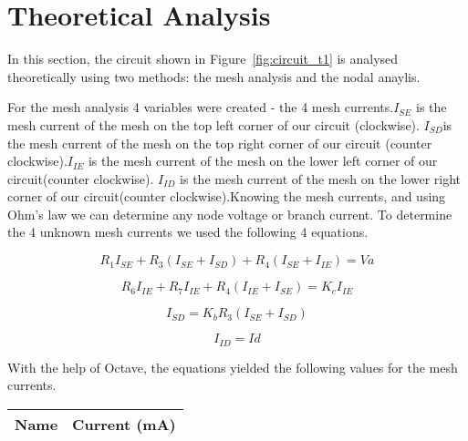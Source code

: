 \section{Theoretical Analysis}
\label{sec:analysis}

In this section, the circuit shown in Figure~\ref{fig:circuit_t1} is analysed
theoretically using two methods: the mesh analysis and the nodal anaylis.\par
For the mesh analysis 4 variables were created - the 4 mesh currents.{\it$I_{SE}$ } is the mesh current of the mesh on the top left corner of our circuit (clockwise). {\it$I_{SD}$}is the mesh current of the mesh on the top right corner of our circuit (counter clockwise).{\it$I_{IE}$ } is the mesh current of the mesh on the lower left corner of our circuit(counter clockwise). {\it$I_{ID}$} is the mesh current of the mesh on the lower right corner of our circuit(counter clockwise).Knowing the mesh currents, and using Ohm's law we can determine any node voltage or branch current. To determine the 4 unknown mesh currents we used the following 4 equations.


%
\begin {equation}
	R_1I_{SE} + R_3(I_{SE}+I_{SD}) + R_4(I_{SE}+I_{IE}) = Va
	\label{eq:m1}
\end{equation}

\begin {equation}
	R_6I_{IE} + R_7I_{IE} + R_4(I_{IE}+I_{SE}) = K_cI_{IE}
	\label{eq:m2}
\end{equation}

\begin {equation}
	I_{SD} = K_bR_3(I_{SE}+I_{SD})
	\label{eq:m3}
\end{equation}

\begin {equation}
	I_{ID} = Id
	\label{eq:m4}
\end{equation}

With the help of Octave, the equations yielded the following values for the mesh currents.\par

\begin{table}[h]
  \centering
  \begin{tabular}{|l|r|}
    \hline    
    {\bf Name} & {\bf Current (mA)}\\ \hline
    
  \end{tabular}
  \label{tab:theoretical_curr}
\end{table}

